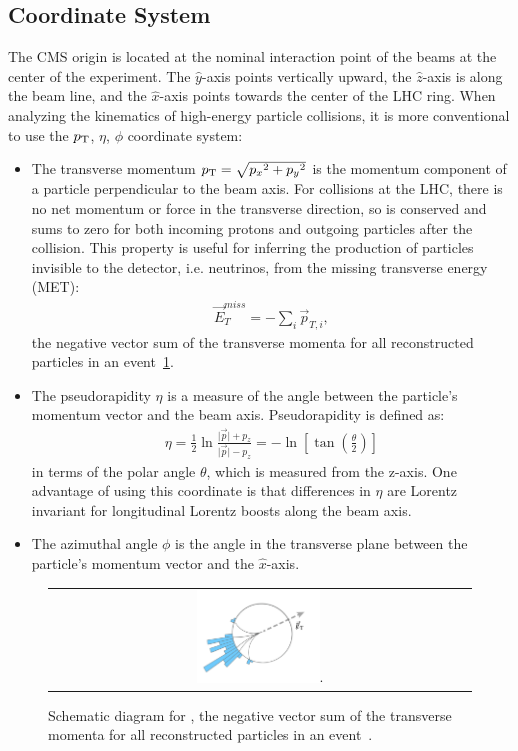 \subsection{Coordinate System}
The CMS origin is located at the nominal interaction point of the beams at the center of the experiment.
The $\hat{y}$-axis points vertically upward, the $\hat{z}$-axis is along the beam line, and the $\hat{x}$-axis points towards the center of the LHC ring.
When analyzing the kinematics of high-energy particle collisions, it is more conventional to use the $p_{\mathrm{T}}$, $\eta$, $\phi$ coordinate system:
\begin{itemize}
\item The transverse momentum $p_{\mathrm{T}} = \sqrt {{p_x}^2+{p_y}^2}$ is the momentum component of a particle perpendicular to the beam axis. 
For collisions at the LHC, there is no net momentum or force in the transverse direction, so \pT is conserved and sums to zero for both incoming protons and outgoing particles after the collision.
This property is useful for inferring the production of particles invisible to the detector, i.e. neutrinos, from the missing transverse energy (MET):
\begin{align}
\vec{E}_T^{miss}=-\sum_{i} \vec{p}_{T,i},
\end{align}
the negative vector sum of the transverse momenta for all reconstructed particles in an event~\ref{met_schematic}.
\item The pseudorapidity $\eta$ is a measure of the angle between the particle's momentum vector and the beam axis.
Pseudorapidity is defined as: 
\begin{align}
\eta=\frac{1}{2} \ln \frac{\vert\vec{p}\vert+p_z}{\vert\vec{p}\vert-p_z}=-\ln \left[\tan \left(\frac{\theta}{2}\right)\right]
\end{align}
in terms of the polar angle $\theta$, which is measured from the z-axis.
One advantage of using this coordinate is that differences in $\eta$ are Lorentz invariant for longitudinal Lorentz boosts along the beam axis.
\item The azimuthal angle $\phi$ is the angle in the transverse plane between the particle's momentum vector and the $\hat{x}$-axis.
\end{itemize}
\begin{figure}[!h]
  \begin{center}
    \begin{tabular}{c}
        \includegraphics[width=0.3\textwidth]{fig_LHC_CMS/met_schematic.pdf}.
    \end{tabular}
    \caption{Schematic diagram for \MET, the negative vector sum of the transverse momenta for all reconstructed particles in an event~\cite{METSchematicDiagram}.
            }
    \label{met_schematic}
  \end{center}
\end{figure}
